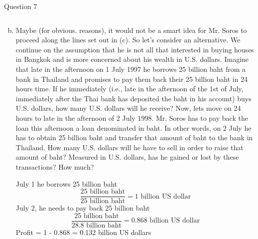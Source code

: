 \documentclass[a4paper]{article}
\newif\IfInSansMode
\numberwithin{equation}{section}
\numberwithin{figure}{section}
\begin{document}
\begin{questionbox}{Question 7}
\begin{enumerate}[(a)]
\begin{explanationbox}
\[				\]
			\end{explanationbox}
			\item Maybe (for obvious. reasons), it would not be a smart idea for Mr. Soros to proceed along the lines set out in (c). So let's consider an alternative. We continue on the assumption that he is not all that interested in buying houses in Bangkok and is more concerned about his wealth in U.S. dollars. Imagine that late in the afternoon on 1 July 1997 he borrows 25 billion baht from a bank in Thailand and promises to pay them back their 25 billion baht in 24 hours time. If he immediately (i.e., late in the afternoon of the 1st of July, immediately after the Thai bank has deposited the baht in his account) buys U.S. dollars, how many U.S. dollars will he receive? Now, lets move on 24 hours to late in the afternoon of 2 July 1998. Mr. Soros has to pay back the loan this afternoon a loan denominated in baht. In other words, on 2 July he has to obtain 25 billion baht and transfer that amount of baht to the bank in Thailand. How many U.S. dollars will he have to sell in order to raise that amount of baht? Measured in U.S. dollars, has he gained or lost by these transactions? How much?
			\begin{explanationbox}
				July 1 he borrows 25 billion baht
				\[
					\frac{25\text{ billion baht}}{25 \text{ billion baht}} = 1 \text{ billion US dollar}
				\]
				July 2, he needs to pay back 25 billion baht
				\[
					\frac{25\text{ billion baht}}{28.8 \text{ billion baht}} = 0.868 \text{ billion US dollar}
				\]
				Profit = 1 - 0.868 = 0.132 billion US dollars
			\end{explanationbox}
		\end{enumerate}
	\end{questionbox}
\end{document}
